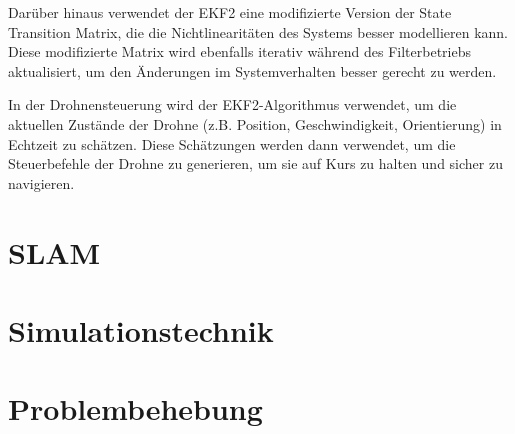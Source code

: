 Darüber hinaus verwendet der EKF2 eine modifizierte Version der State Transition Matrix, die die Nichtlinearitäten des Systems besser modellieren kann. Diese modifizierte Matrix wird ebenfalls iterativ während des Filterbetriebs aktualisiert, um den Änderungen im Systemverhalten besser gerecht zu werden.

In der Drohnensteuerung wird der EKF2-Algorithmus verwendet, um die aktuellen Zustände der Drohne (z.B. Position, Geschwindigkeit, Orientierung) in Echtzeit zu schätzen. Diese Schätzungen werden dann verwendet, um die Steuerbefehle der Drohne zu generieren, um sie auf Kurs zu halten und sicher zu navigieren.

\section{SLAM} \label{SLAM:section}

\section{Simulationstechnik} \label{simulationstechnik:section}

\section{Problembehebung} \label{problembehebung:section}
